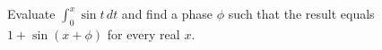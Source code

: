 Evaluate $\int_0^x\sin t\,dt$ and find a phase $\phi$ such that the result equals $1+\sin(x+\phi)$ for every real $x$.
